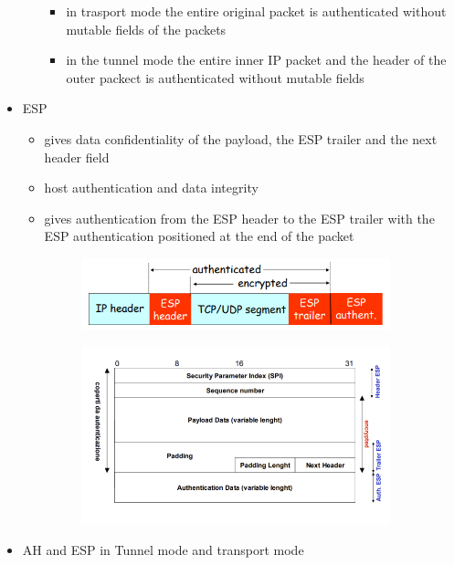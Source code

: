 \documentclass{article}
\begin{document}
\begin{itemize}
\begin{itemize}
\begin{itemize}
            \item in trasport mode the entire original packet is authenticated without mutable fields of the packets
            \item in the tunnel mode the entire inner IP packet and the header of the outer packect is authenticated without mutable fields
        \end{itemize}
    \end{itemize}
    \item ESP
    \begin{itemize}
        \item gives data confidentiality of the payload, the ESP trailer and the next header field
        \item host authentication and data integrity
        \item gives authentication from the ESP header to the ESP trailer with the ESP authentication positioned at the end of the packet
        \begin{figure}[h]
        \centering
        \includegraphics[width=0.90\textwidth]{figure/ESP_format.png}
        \end{figure}
        \begin{figure}[h]
        \centering
        \includegraphics[width=0.90\textwidth]{figure/ESP_packet.png}
        \end{figure}   
    \end{itemize}
    \item AH and ESP in Tunnel mode and transport mode 

\end{itemize}
\end{document}
